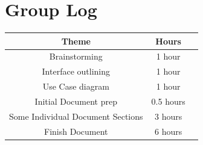 \documentclass{scrreprt}
\begin{document}
\appendix

\chapter{Group Log}
\begin{center}
\begin{tabular}{|c|c|c|}
    \hline
    Theme & Hours\\
    \hline
    Brainstorming & 1 hour\\
    Interface outlining & 1 hour\\
    Use Case diagram & 1 hour\\
    Initial Document prep & 0.5 hours\\
    Some Individual Document Sections & 3 hours\\
    Finish Document & 6 hours\\
    \hline
\end{tabular}
\end{center}
\end{document}
